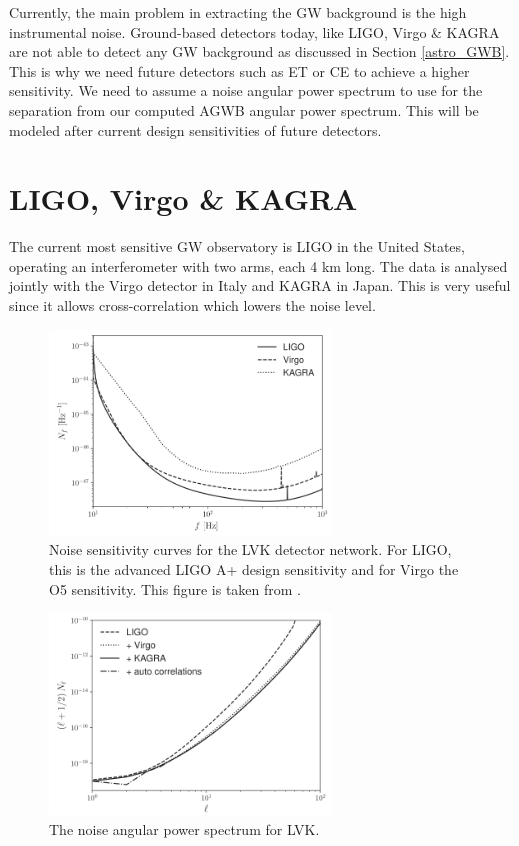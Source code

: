 Currently, the main problem in extracting the GW background is the high instrumental noise. Ground-based detectors today, like LIGO, Virgo \& KAGRA are not able to detect any GW background as discussed in Section \ref{astro_GWB}. This is why we need future detectors such as ET or CE to achieve a higher sensitivity. We need to assume a noise angular power spectrum to use for the separation from our computed AGWB angular power spectrum. This will be modeled after current design sensitivities of future detectors.

\section{LIGO, Virgo \& KAGRA}

The current most sensitive GW observatory is LIGO in the United States, operating an interferometer with two arms, each 4 km long. The data is analysed jointly with the Virgo detector in Italy and KAGRA in Japan. This is very useful since it allows cross-correlation which lowers the noise level.

\begin{figure}[h]
    \centering
    \includegraphics[width=7.5cm]{Images/lvk_frequency_noise.png}
    \caption[Noise sensitivity with respect to frequency for LVK.]{Noise sensitivity curves for the LVK detector network. For LIGO, this is the advanced LIGO A+ design sensitivity and for Virgo the O5 sensitivity. This figure is taken from \cite{alonso_noise_2020}.}
    \label{lvk_frequency}
\end{figure}

\begin{figure}[h]
    \centering
        \includegraphics[width=7.5cm]{Images/alonso_ligo_noise.png}
    \caption{The noise angular power spectrum for LVK.}
    \label{lvk_Cl}
\end{figure} 


